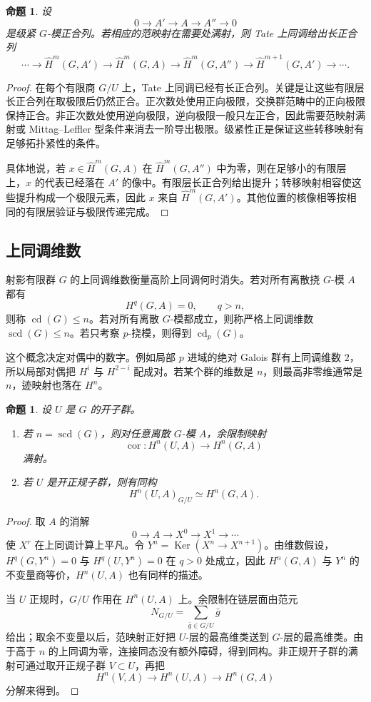\documentclass[11pt,a4paper,openany]{ctexbook}
\numberwithin{equation}{chapter}
\newcommand{\Ker}{\operatorname{Ker}}
\theoremstyle{plain}
\newtheorem{proposition}[theorem]{命题}
\theoremstyle{definition}
\theoremstyle{remark}
\begin{document}
\begin{proposition}
设
\[
0\longrightarrow A'\longrightarrow A\longrightarrow A''\longrightarrow 0
\]
是级紧 $G$-模正合列。若相应的范映射在需要处满射，则 Tate 上同调给出长正合列
\[
\cdots\to \widehat H^m(G,A')\to \widehat H^m(G,A)\to
\widehat H^m(G,A'')\to \widehat H^{m+1}(G,A')\to\cdots .
\]
\end{proposition}

\begin{proof}
在每个有限商 $G/U$ 上，Tate 上同调已经有长正合列。关键是让这些有限层长正合列在取极限后仍然正合。正次数处使用正向极限，交换群范畴中的正向极限保持正合。非正次数处使用逆向极限，逆向极限一般只左正合，因此需要范映射满射或 Mittag--Leffler 型条件来消去一阶导出极限。级紧性正是保证这些转移映射有足够拓扑紧性的条件。

具体地说，若 $x\in \widehat H^m(G,A)$ 在 $\widehat H^m(G,A'')$ 中为零，则在足够小的有限层上，$x$ 的代表已经落在 $A'$ 的像中。有限层长正合列给出提升；转移映射相容使这些提升构成一个极限元素，因此 $x$ 来自 $\widehat H^m(G,A')$。其他位置的核像相等按相同的有限层验证与极限传递完成。
\end{proof}

\subsection{上同调维数}

射影有限群 $G$ 的上同调维数衡量高阶上同调何时消失。若对所有离散挠 $G$-模 $A$ 都有
\[
H^q(G,A)=0,\qquad q>n,
\]
则称 $\operatorname{cd}(G)\leq n$。若对所有离散 $G$-模都成立，则称严格上同调维数 $\operatorname{scd}(G)\leq n$。若只考察 $p$-挠模，则得到 $\operatorname{cd}_p(G)$。

这个概念决定对偶中的数字。例如局部 $p$ 进域的绝对 Galois 群有上同调维数 $2$，所以局部对偶把 $H^i$ 与 $H^{2-i}$ 配成对。若某个群的维数是 $n$，则最高非零维通常是 $n$，迹映射也落在 $H^n$。

\begin{proposition}
设 $U$ 是 $G$ 的开子群。
\begin{enumerate}[label=(\arabic*)]
\item 若 $n=\operatorname{scd}(G)$，则对任意离散 $G$-模 $A$，余限制映射
\[
\operatorname{cor}:H^n(U,A)\longrightarrow H^n(G,A)
\]
满射。
\item 若 $U$ 是开正规子群，则有同构
\[
H^n(U,A)_{G/U}\simeq H^n(G,A).
\]
\end{enumerate}
\end{proposition}

\begin{proof}
取 $A$ 的消解
\[
0\to A\to X^0\to X^1\to\cdots
\]
使 $X^r$ 在上同调计算上平凡。令 $Y^n=\Ker(X^n\to X^{n+1})$。由维数假设，$H^q(G,Y^n)=0$ 与 $H^q(U,Y^n)=0$ 在 $q>0$ 处成立，因此 $H^n(G,A)$ 与 $Y^n$ 的不变量商等价，$H^n(U,A)$ 也有同样的描述。

当 $U$ 正规时，$G/U$ 作用在 $H^n(U,A)$ 上。余限制在链层面由范元
\[
N_{G/U}=\sum_{\bar g\in G/U}\bar g
\]
给出；取余不变量以后，范映射正好把 $U$-层的最高维类送到 $G$-层的最高维类。由于高于 $n$ 的上同调为零，连接同态没有额外障碍，得到同构。非正规开子群的满射可通过取开正规子群 $V\subset U$，再把
\[
H^n(V,A)\to H^n(U,A)\to H^n(G,A)
\]
分解来得到。
\end{proof}
\end{document}
